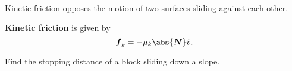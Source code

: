 \documentclass[../classical_mechanics.tex]{subfiles}
\begin{document}
        \paragraph{}
        Kinetic friction opposes the motion of two surfaces sliding against each other.
        \begin{definition}
            \textbf{Kinetic friction} is given by
            \begin{equation}
                \vec{f}_k=-\mu_k\abs{\vec{N}}\hat{v}.
            \end{equation}
        \end{definition}
        \begin{example}
            Find the stopping distance of a block sliding down a slope.
        \end{example}
\end{document}
